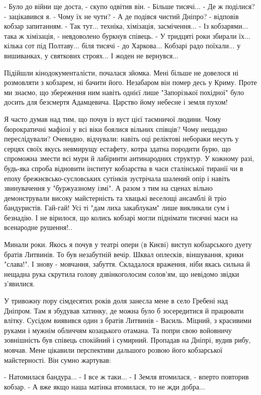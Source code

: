 - Було до війни ще доста, - скупо одвітив він. - Більше тисячі...
- Де ж поділися? - зацікавився я. - Чому їх не чути?
- А де подівся чистий Дніпро? - відповів кобзар запитанням.
- Так тут... техніка, хімізація, засмічення...
- Із кобзарями... така ж хімізація, - невдоволено буркнув співець. - У тридцяті роки збирали їх... кілька сот під Полтаву... біля тисячі - до Харкова... Кобзарі радо поїхали... у вишиванках, у святкових строях... І жоден не вернувся...

Підійшли кінодокументалісти, почалася зйомка. Мені більше не довелося ні
розмовляти з кобзарем, ні бачити його. Незабаром він помер десь у Криму. Проте
ми знаємо, що збереження ним навіть однієї лише "Запорізької похідної" було
досить для безсмертя Адамцевича. Царство йому небесне і земля пухом!

Я часто думав над тим, що почув із вуст цієї таємничої людини. Чому
бюрократичні мафіозі у всі віки боялися вільних співців? Чому нещадно
переслідували? Очевидно, відчували: навіть оці реліктові небораки несуть у
серцях своїх якусь невмирущу естафету, котра здатна породити бурю, що спроможна
змести всі мури й лабіринти антинародних структур. У кожному разі, будь-яка
спроба відновити інститут кобзарства в часи сталінської тиранії чи в епоху
брежнєвсько-сусловських сутінків зустрічала шалений опір і навіть звинувачення
у "буржуазному ізмі". А разом з тим на сценах вільно демонстрували високу
майстерність та хвацькі веселощі ансамблі й тріо бандуристів. Гай-гай! Усі ті
"дам лиха закаблукам" лише викликали сум і безнадію. І не вірилося, що колись
кобзарі могли піднімати тисячні маси на всенародне рушення!..

Минали роки. Якось я почув у театрі опери (в Києві) виступ кобзарського дуету
братів Литвинів. То був незабутній вечір. Шквал оплесків, віншування, крики
"слава!". І знову - мовчання, забуття. Складалося враження, ніби якась сильна й
нещадна рука скрутила голову дзвінкоголосим солов'ям, що невідомо звідки
з'явилися.

У тривожну пору сімдесятих років доля занесла мене в село Гребені над Дніпром.
Там я збудував хатинку, де можна було б зосередитися й працювати влітку.
Сусідом виявився один з братів Литвинів - Василь. Міцний, з красивими руками і
мужнім обличчям козацького отамана. Та попри свою войовничу зовнішність був
співець спокійний і сумирний. Пропадав на Дніпрі, вудив рибу, мовчав. Мене
цікавили перспективи дальшого розвою його кобзарської майстерності. Він сумно
жартував:

- Натомилася бандура...
- І все ж таки...
- І Земля втомилася, - вперто повторив кобзар. - А вже якщо наша матінка втомилася, то не жди добра...

